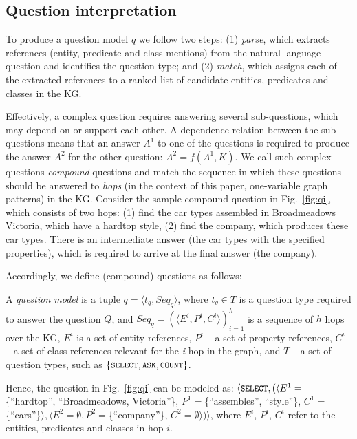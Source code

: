 \subsection{Question interpretation}

To produce a question model $q$ we follow two steps: (1) \textit{parse}, which extracts references (entity, predicate and class mentions) from the natural language question and identifies the question type; and (2) \textit{match}, which assigns each of the extracted references to a ranked list of candidate entities, predicates and classes in the KG.

Effectively, a complex question requires answering several sub-questions, which may depend on or support each other. A dependence relation between the sub-questions means that an answer $A^1$ to one of the questions is required to produce the answer $A^2$ for the other question: $A^2=f(A^1,K)$. 
We call such complex questions \textit{compound} questions and match the sequence in which these questions should be answered to \textit{hops} (in the context of this paper, one-variable graph patterns) in the KG.
Consider the sample compound question in Fig.~\ref{fig:qi}, which consists of two hops: (1) find the car types assembled in Broadmeadows Victoria, which have a hardtop style, (2) find the company, which produces these car types. There is an intermediate answer (the car types with the specified properties), which is required to arrive at the final answer (the company).

Accordingly, we define (compound) questions as follows:

\begin{definition}\label{def:question}
\rm
A \emph{question model} is a tuple $q=\langle t_q, Seq_q \rangle$, where $t_q \in T$ is a question type required to answer the question $Q$, and $Seq_q = (\langle E^i, P^i, C^i\rangle)_{i=1}^h$ is a sequence of $h$ hops over the KG, $E^i$ is a set of entity references, $P^i$ -- a set of property references, $C^i$ -- a set of class references relevant for the \textit{i}-hop in the graph, and $T$ -- a set of question types, such as $\{\texttt{\small SELECT}, \texttt{\small ASK}, \texttt{\small COUNT}\}$.
\end{definition}

\noindent%
Hence, the question in Fig.~\ref{fig:qi} can be modeled as: $\langle \texttt{\small SELECT}, (\langle E^1={}$\{``hardtop'', ``Broadmeadows, Victoria''\}, $P^1={}$\{``assembles'', ``style''\}, $C^1={}$\{``cars''\}$\rangle, \langle E^2=\emptyset, P^2={}$\{``company''\}, $C^2=\emptyset\rangle) \rangle$, where $E^i$, $P^i$, $C^i$ refer to the entities, predicates and classes in hop $i$.

